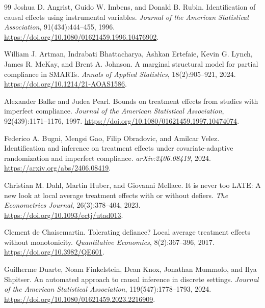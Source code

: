 \documentclass[11pt]{article}
\theoremstyle{definition}
\theoremstyle{plain}
\theoremstyle{remark}
\begin{document}
\begin{thebibliography}{99}
Joshua D. Angrist, Guido W. Imbens, and Donald B. Rubin.
\newblock Identification of causal effects using instrumental variables.
\newblock \emph{Journal of the American Statistical Association}, 91(434):444--455, 1996.
\newblock \url{https://doi.org/10.1080/01621459.1996.10476902}.

William J. Artman, Indrabati Bhattacharya, Ashkan Ertefaie, Kevin G. Lynch, James R. McKay, and Brent A. Johnson.
\newblock A marginal structural model for partial compliance in SMARTs.
\newblock \emph{Annals of Applied Statistics}, 18(2):905--921, 2024.
\newblock \url{https://doi.org/10.1214/21-AOAS1586}.

Alexander Balke and Judea Pearl.
\newblock Bounds on treatment effects from studies with imperfect compliance.
\newblock \emph{Journal of the American Statistical Association}, 92(439):1171--1176, 1997.
\newblock \url{https://doi.org/10.1080/01621459.1997.10474074}.

Federico A. Bugni, Mengsi Gao, Filip Obradovic, and Amilcar Velez.
\newblock Identification and inference on treatment effects under covariate-adaptive randomization and imperfect compliance.
\newblock \emph{arXiv:2406.08419}, 2024.
\newblock \url{https://arxiv.org/abs/2406.08419}.

Christian M. Dahl, Martin Huber, and Giovanni Mellace.
\newblock It is never too LATE: A new look at local average treatment effects with or without defiers.
\newblock \emph{The Econometrics Journal}, 26(3):378--404, 2023.
\newblock \url{https://doi.org/10.1093/ectj/utad013}.

Clement de Chaisemartin.
\newblock Tolerating defiance? Local average treatment effects without monotonicity.
\newblock \emph{Quantitative Economics}, 8(2):367--396, 2017.
\newblock \url{https://doi.org/10.3982/QE601}.

Guilherme Duarte, Noam Finkelstein, Dean Knox, Jonathan Mummolo, and Ilya Shpitser.
\newblock An automated approach to causal inference in discrete settings.
\newblock \emph{Journal of the American Statistical Association}, 119(547):1778--1793, 2024.
\newblock \url{https://doi.org/10.1080/01621459.2023.2216909}.


\end{thebibliography}
\end{document}
